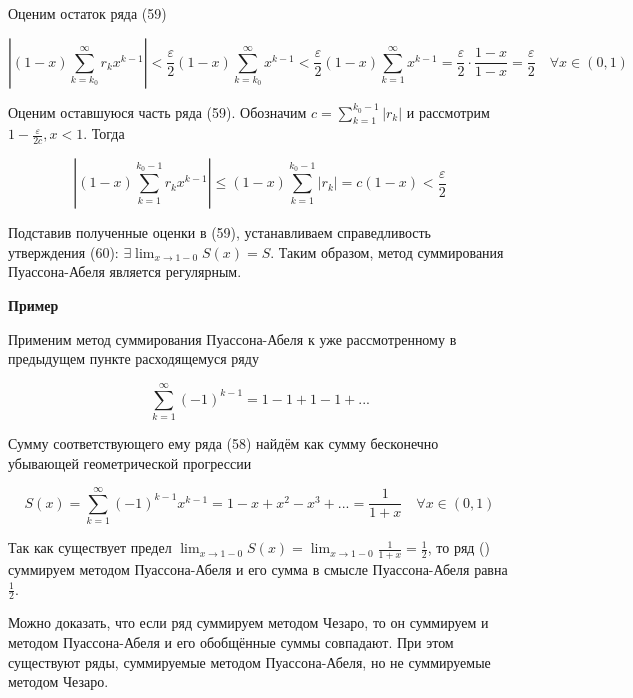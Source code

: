 Оценим остаток ряда (59)

\begin{equation*}
	\left| (1-x)\displaystyle\sum_{k = k_0}^\infty r_k x^{k - 1} \right| < \frac{\varepsilon}{2}(1 - x)\displaystyle\sum_{k = k_0}^\infty x^{k - 1} < \frac{\varepsilon}{2}(1 - x)\displaystyle\sum_{k = 1}^\infty x^{k - 1} = \frac{\varepsilon}{2} \cdot \frac{1 - x}{1 - x} = \frac{\varepsilon}{2} \quad \forall x \in (0, 1)
\end{equation*}

Оценим оставшуюся часть ряда (59). Обозначим $c = \displaystyle\sum_{k = 1}^{k_0 - 1} |r_k|$ и рассмотрим {\small $1 - \frac{\varepsilon}{2c}, x < 1$}. Тогда

\begin{equation*}
	\left| (1 - x)\displaystyle\sum_{k = 1}^{k_0 - 1} r_kx^{k - 1} \right| \leqslant (1 - x)\displaystyle\sum_{k = 1}^{k_0 - 1} |r_k| = c(1 - x) < \frac{\varepsilon}{2}
\end{equation*}

Подставив полученные оценки в (59), устанавливаем справедливость утверждения (60): $\exists \displaystyle\lim_{x \rightarrow 1 - 0} S(x) = S$. Таким образом, метод суммирования Пуассона-Абеля является регулярным.

\textbf{Пример}

Применим метод суммирования Пуассона-Абеля к уже рассмотренному в предыдущем пункте расходящемуся ряду

\begin{equation}
	\displaystyle\sum_{k = 1}^\infty (-1)^{k - 1} = 1 - 1 + 1 - 1 + ...
\end{equation}

Сумму соответствующего ему ряда (58) найдём как сумму бесконечно убывающей геометрической прогрессии

\begin{equation*}
	S(x) = \displaystyle\sum_{k = 1}^\infty (-1)^{k - 1}x^{k - 1} = 1 - x + x^2 - x^3 + ... = \frac{1}{1 + x}\quad \forall x \in (0, 1)
\end{equation*}

Так как существует предел $\displaystyle\lim_{x \rightarrow 1 - 0} S(x) = \displaystyle\lim_{x \rightarrow 1 - 0} \frac{1}{1 + x} = \frac{1}{2}$, то ряд () суммируем методом Пуассона-Абеля и его сумма в смысле Пуассона-Абеля равна $\frac{1}{2}$.

Можно доказать, что если ряд суммируем методом Чезаро, то он суммируем и методом Пуассона-Абеля и его обобщённые суммы совпадают. При этом существуют ряды, суммируемые методом Пуассона-Абеля, но не суммируемые методом Чезаро.
